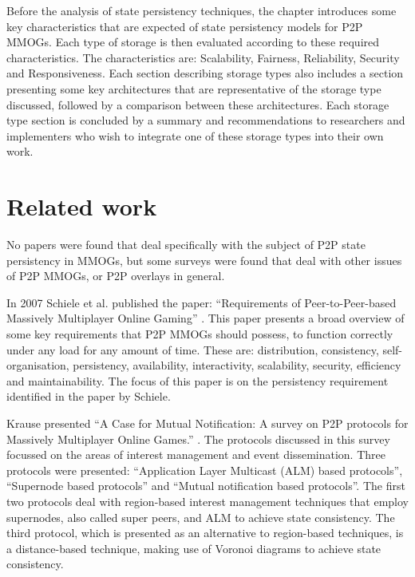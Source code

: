 \documentclass[10pt,a4paper,journal,cspaper,compsoc]{IEEEtran}
\begin{document}
Before the analysis of state persistency techniques, the chapter introduces some key characteristics that are expected of state persistency models
for P2P MMOGs. Each type of storage is then evaluated according to these required characteristics. The characteristics are: Scalability, Fairness,
Reliability, Security and Responsiveness. Each section describing storage types also includes a section presenting some key architectures that are
representative of the storage type discussed, followed by a comparison between these architectures. Each storage type section is concluded by a
summary and recommendations to researchers and implementers who wish to integrate one of these storage types into their own work.

\section{Related work}
\label{related_work}

No papers were found that deal specifically with the subject of P2P state persistency in MMOGs, but some surveys were found that deal with other
issues of P2P MMOGs, or P2P overlays in general.

In 2007 Schiele et al. published the paper: ``Requirements of Peer-to-Peer-based Massively Multiplayer Online Gaming''
\cite{Schiele_p2p_requirements}. This paper presents a broad overview of some key requirements that P2P MMOGs should possess, to function correctly
under any load for any amount of time. These are: distribution, consistency, self-organisation, persistency, availability, interactivity,
scalability, security, efficiency and maintainability. The focus of this paper is on the persistency requirement identified in the paper by Schiele.

Krause presented ``A Case for Mutual Notification: A survey on P2P protocols for Massively Multiplayer Online Games.''
\cite{IM_and_ED_survey_Krause}. The protocols discussed in this survey focussed on the areas of interest management and event dissemination. Three
protocols were presented: ``Application Layer Multicast (ALM) based protocols'', ``Supernode based protocols'' and ``Mutual notification based
protocols''. The first two protocols deal with region-based interest management techniques that employ supernodes, also called super peers, and ALM
to achieve state consistency. The third protocol, which is presented as an alternative to region-based techniques, is a distance-based technique,
making use of Voronoi diagrams to achieve state consistency.
\end{document}
